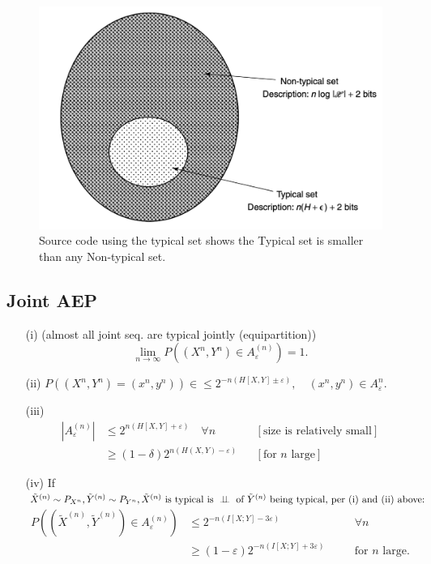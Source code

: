 \begin{figure}[h]
    \centering
    \includegraphics[scale=0.6]{lectures/wk13/img/typical_sets.png}
    \caption{Source code using the typical set shows the Typical set is smaller than any Non-typical set.}
    \label{fig:typical-sets}
\end{figure}

\subsection{Joint AEP}
\begin{enumerate}
\item[(i)] (almost all joint seq. are typical jointly (equipartition))
\begin{equation}
\lim_{n \to \infty} P\left(\left(X^n, Y^n\right) \in A_{\varepsilon}^{(n)}\right) 
= 1. 
\end{equation}

\item[(ii)] $P\left(\left(X^n, Y^n\right) = \left(x^n, y^n\right)\right) \in \leq 2^{-n(H[X,Y]\pm\varepsilon)}, \quad \left(x^n, y^n\right)\in A_{\varepsilon}^n$.

\item[(iii)] 
\begin{align}
\left|A_{\varepsilon}^{(n)}\right| 
    &\leq 2^{n(H[X,Y]+\varepsilon)}
\quad\forall n &&[\text{size is relatively small}]
\\
&\geq (1-\delta)2^{n(H(X,Y)-\varepsilon)}
&&[\text{for $n$ large}]
\end{align}

\item[(iv)] If $\tilde{X}^{(n)}\sim P_{X^n}, \tilde{Y}^{(n)} \sim P_{Y^n}, \tilde{X}^{(n)} \text{ is typical is } \mathrel{\perp\!\!\!\perp} \text{ of $\tilde{Y}^{(n)}$ being typical, per (i) and (ii) above: }$ 
\begin{align}
P\left(\left(\tilde X^{(n)}, \tilde Y^{(n)}\right) \in A_{\varepsilon}^{(n)}\right) &\leq 2^{-n(I[X;Y]-3\varepsilon)} \quad &&\forall n 
\\
&\geq (1-\varepsilon)2^{-n(I[X;Y]+3\varepsilon)} \quad &&\text{for } n \text{ large}. 
\end{align}
\end{enumerate}


